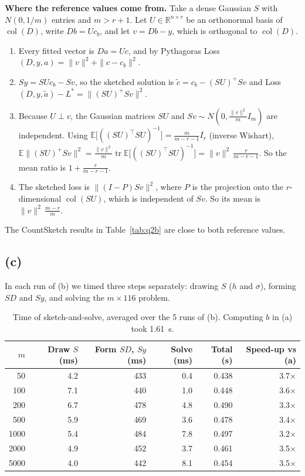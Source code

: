 \textbf{Where the reference values come from.} Take a dense Gaussian $S$ with $N(0,1/m)$ entries and
$m > r+1$. Let $U \in \mathbb{R}^{n\times r}$ be an orthonormal basis of $\operatorname{col}(D)$, write
$Db = Uc_b$, and let $v = Db-y$, which is orthogonal to $\operatorname{col}(D)$.
\begin{enumerate}
    \item Every fitted vector is $Da = Uc$, and by Pythagoras Loss$(D,y,a) = \|v\|^2 + \|c-c_b\|^2$.
    \item $Sy = SUc_b - Sv$, so the sketched solution is $\tilde c = c_b - (SU)^+Sv$ and
    Loss$(D,y,\tilde a) - L^* = \|(SU)^+Sv\|^2$.
    \item Because $U \perp v$, the Gaussian matrices $SU$ and $Sv \sim N(0, \tfrac{\|v\|^2}{m} I_m)$ are
    independent. Using $\mathbb{E}\big[((SU)^\top SU)^{-1}\big] = \tfrac{m}{m-r-1} I_r$ (inverse Wishart),
    $\mathbb{E}\|(SU)^+Sv\|^2 = \tfrac{\|v\|^2}{m}\operatorname{tr}\mathbb{E}\big[((SU)^\top SU)^{-1}\big]
    = \|v\|^2\,\tfrac{r}{m-r-1}$. So the mean ratio is $1 + \tfrac{r}{m-r-1}$.
    \item The sketched loss is $\|(I-P)Sv\|^2$, where $P$ is the projection onto the $r$-dimensional
    $\operatorname{col}(SU)$, which is independent of $Sv$. So its mean is $\|v\|^2\,\tfrac{m-r}{m}$.
\end{enumerate}
The CountSketch results in Table~\ref{tab:q2b} are close to both reference values.

\subsection*{(c)}

In each run of (b) we timed three steps separately: drawing $S$ ($h$ and $\sigma$), forming $SD$ and $Sy$,
and solving the $m \times 116$ problem.

\begin{table}[H]
\centering
\begin{tabular}{rrrrrr}
\toprule
$m$ & Draw $S$ (ms) & Form $SD$, $Sy$ (ms) & Solve (ms) & Total (s) & Speed-up vs (a) \\
\midrule
50 & 4.2 & 433 & 0.4 & 0.438 & 3.7$\times$ \\
100 & 7.1 & 440 & 1.0 & 0.448 & 3.6$\times$ \\
200 & 6.7 & 478 & 4.8 & 0.490 & 3.3$\times$ \\
500 & 5.9 & 469 & 3.6 & 0.478 & 3.4$\times$ \\
1000 & 5.4 & 484 & 7.8 & 0.497 & 3.2$\times$ \\
2000 & 4.9 & 452 & 3.7 & 0.461 & 3.5$\times$ \\
5000 & 4.0 & 442 & 8.1 & 0.454 & 3.5$\times$ \\
\bottomrule
\end{tabular}
\caption{Time of sketch-and-solve, averaged over the 5 runs of (b). Computing $b$ in (a) took 1.61~s.}
\end{table}

